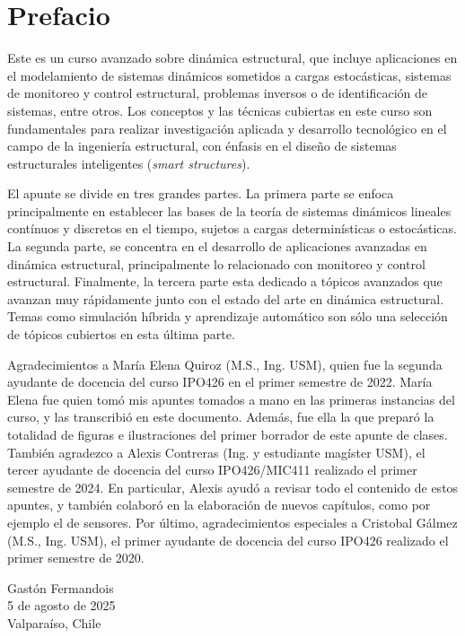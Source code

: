 \chapter*{Prefacio}

Este es un curso avanzado sobre dinámica estructural, que incluye aplicaciones en el modelamiento de sistemas dinámicos sometidos a cargas estocásticas, sistemas de monitoreo y control estructural, problemas inversos o de identificación de sistemas, entre otros. Los conceptos y las técnicas cubiertas en este curso son fundamentales para realizar investigación aplicada y desarrollo tecnológico en el campo de la ingeniería estructural, con énfasis en el diseño de sistemas estructurales inteligentes (\emph{smart structures}).

El apunte se divide en tres grandes partes. La primera parte se enfoca principalmente en establecer las bases de la teoría de sistemas dinámicos lineales contínuos y discretos en el tiempo, sujetos a cargas determinísticas o estocásticas. La segunda parte, se concentra en el desarrollo de aplicaciones avanzadas en dinámica estructural, principalmente lo relacionado con monitoreo y control estructural. Finalmente, la tercera parte esta dedicado a tópicos avanzados que avanzan muy rápidamente junto con el estado del arte en dinámica estructural. Temas como simulación híbrida y aprendizaje automático son sólo una selección de tópicos cubiertos en esta última parte.

Agradecimientos a María Elena Quiroz (M.S., Ing. USM), quien fue la segunda ayudante de docencia del curso IPO426 en el primer semestre de 2022. María Elena fue quien tomó mis apuntes tomados a mano en las primeras instancias del curso, y las transcribió en este documento. Además, fue ella la que preparó la totalidad de figuras e ilustraciones del primer borrador de este apunte de clases. También agradezco a Alexis Contreras (Ing. y estudiante magíster USM), el tercer ayudante de docencia del curso IPO426/MIC411 realizado el primer semestre de 2024. En particular, Alexis ayudó a revisar todo el contenido de estos apuntes, y también colaboró en la elaboración de nuevos capítulos, como por ejemplo el de sensores. Por último, agradecimientos especiales a Cristobal Gálmez (M.S., Ing. USM), el primer ayudante de docencia del curso IPO426 realizado el primer semestre de 2020.

\bigskip\noindent
\begin{flushright}
  Gastón Fermandois\\
  5 de agosto de 2025\\
  Valparaíso, Chile
\end{flushright}